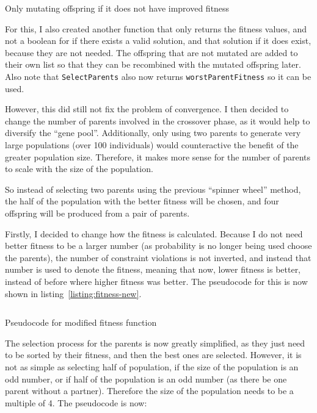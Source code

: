 \begin{listing}[!ht]
	\inputminted[linenos, fontsize=\footnotesize]{text}{code/selective-mutation.txt}
	\caption{Only mutating offspring if it does not have improved fitness}
	\label{listing:selective-mutation}
\end{listing}

For this, I also created another function that only returns the fitness values, 
and not a boolean for if there exists a valid solution, and that solution if it
does exist, because they are not needed.
The offspring that are not mutated are added to their own list so that they can
be recombined with the mutated offspring later.
Also note that \verb|SelectParents| also now returns \verb|worstParentFitness| 
so it can be used.

However, this did still not fix the problem of convergence. 
I then decided to change the number of parents involved in the crossover phase,
as it would help to diversify the ``gene pool''.
Additionally, only using two parents to generate very large populations (over 
100 individuals) would counteractive the benefit of the greater population size.
Therefore, it makes more sense for the number of parents to scale with the size
of the population.

So instead of selecting two parents using the previous ``spinner wheel'' method,
the half of the population with the better fitness will be chosen, and four 
offspring will be produced from a pair of parents.

Firstly, I decided to change how the fitness is calculated.
Because I do not need better fitness to be a larger number (as probability is no
longer being used choose the parents), the number of constraint violations is
not inverted, and instead that number is used to denote the fitness, meaning
that now, lower fitness is better, instead of before where higher fitness was 
better.
The pseudocode for this is now shown in listing~\ref*{listing:fitness-new}.

\begin{listing}[!ht]
	\inputminted[linenos, fontsize=\footnotesize]{text}{code/fitness-new.txt}
	\caption{Pseudocode for modified fitness function}
	\label{listing:fitness-new}
\end{listing}

The selection process for the parents is now greatly simplified, as they just
need to be sorted by their fitness, and then the best ones are selected.
However, it is not as simple as selecting half of population, if the size of the
population is an odd number, or if half of the population is an odd number (as 
there be one parent without a partner).
Therefore the size of the population needs to be a multiple of 4.
The pseudocode is now:

